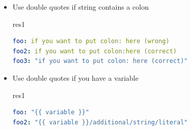 \documentclass[pdf, 8pt, unicode, t]{beamer} %
\begin{document}
\begin{frame}[fragile,label=yaml4]
\begin{columns}[t,onlytextwidth]
\begin{itemize}
\item Use double quotes if string contains a colon
  \begin{beamercolorbox}[wd=0.9\textwidth,sep=-1.0em,rounded=true,shadow=true,center]{res1}
  \begin{lstlisting}[language=yaml]
foo: if you want to put colon: here (wrong)
foo2: if you want to put colon:here (correct)
foo3: "if you want to put colon: here (correct)"
  \end{lstlisting}
  \end{beamercolorbox}

\item Use double quotes if you have a variable
  \begin{beamercolorbox}[wd=0.9\textwidth,sep=-1.0em,rounded=true,shadow=true,center]{res1}
  \begin{lstlisting}[language=yaml]
foo: "{{ variable }}"
foo2: "{{ variable }}/additional/string/literal"
  \end{lstlisting}
  \end{beamercolorbox}

\end{itemize}

\end{columns}

\end{frame}

\end{document}
